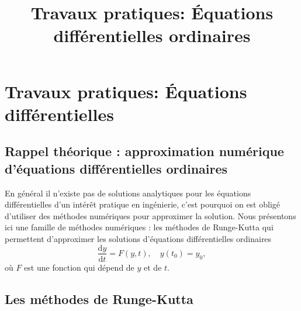 \documentclass[a4paper,10pt]{article}
\title{Travaux pratiques: \'Equations différentielles ordinaires}
\date{}
\newcommand{\dd}{\mathrm{d}}
\begin{document}
\maketitle

\section*{Travaux pratiques: Équations différentielles}

\subsection*{Rappel théorique : approximation numérique d’équations
différentielles ordinaires}

En général il n’existe pas de solutions analytiques pour les équations différentielles d’un intérêt pratique en ingénierie, 
c’est pourquoi on est obligé d’utiliser des méthodes
numériques pour approximer la solution.
Nous présentons ici une famille de méthodes numériques : les méthodes de
Runge-Kutta qui permettent d’approximer
les solutions d’équations différentielles ordinaires
\begin{equation*}
 \frac{\dd y}{\dd t} = F(y,t), \quad y(t_0)=y_0,
\end{equation*}
où $F$ est une fonction qui dépend de $y$ et de $t$.

\subsection*{Les méthodes de Runge-Kutta}
\end{document}
